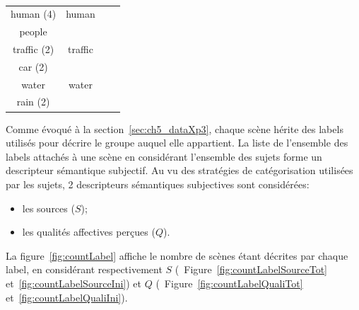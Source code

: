 \begin{table}[t]
\begin{tabular}{cc|cc}
human (4)             & human                   &                        &  \\  
people                &                         &                        & \\       
\cline{1-2}
traffic (2)           & traffic                 &                        & \\
car (2)               &                         &                        &  \\                   
\cline{1-2}
water                 & water                   &                        & \\ 
rain (2)              &                         &                        & \\
\end{tabular}
\vspace{0.5mm}
\caption{\label{tab:association}}
\end{table}

Comme évoqué à la section~\ref{sec:ch5_dataXp3}, chaque scène hérite des labels utilisés pour décrire le groupe auquel elle appartient. La liste de l'ensemble des labels attachés à une scène en considérant l'ensemble des sujets forme un descripteur sémantique subjectif. Au vu des stratégies de catégorisation utilisées par les sujets, 2 descripteurs sémantiques subjectives sont considérées:

\begin{itemize}
\item les sources ($S$);
\item les qualités affectives perçues ($Q$).
\end{itemize}

La figure~\ref{fig:countLabel} affiche le nombre de scènes étant décrites par chaque label, en considérant respectivement $S$ (\cf~Figure~\ref{fig:countLabelSourceTot} et~\ref{fig:countLabelSourceIni}) et $Q$ (\cf~Figure~\ref{fig:countLabelQualiTot} et~\ref{fig:countLabelQualiIni}).

